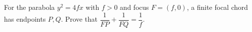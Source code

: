For the parabola $y^2=4fx$ with $f>0$ and focus $F=(f,0)$, a finite focal chord has endpoints $P,Q$. Prove that $\dfrac{1}{FP}+\dfrac{1}{FQ}=\dfrac{1}{f}$.
